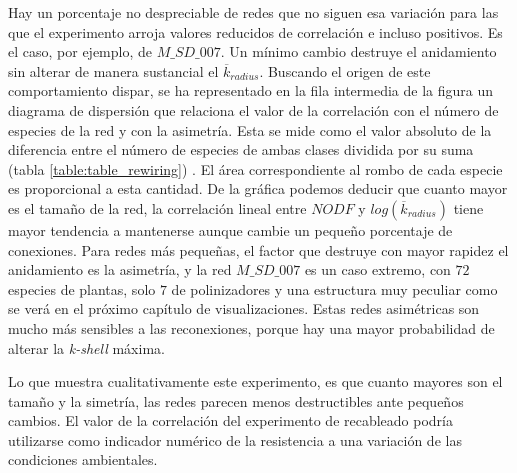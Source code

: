 Hay un porcentaje no despreciable de redes que no siguen esa variación para las que el experimento arroja valores reducidos de correlación e incluso positivos. Es el caso, por ejemplo, de $M\_SD\_007$. Un mínimo cambio destruye el anidamiento sin alterar de manera sustancial el $\overline {k}_{radius}$. Buscando el origen de este comportamiento dispar, se ha representado en la fila intermedia de la figura un diagrama de dispersión que relaciona el valor de la correlación con el número de especies de la red y con la asimetría. Esta se mide como el valor absoluto de la diferencia entre el número de especies de ambas clases dividida por su suma (tabla \ref{table:table_rewiring}) . El área correspondiente al rombo de cada especie es proporcional a esta cantidad. De la gráfica podemos deducir que cuanto mayor es el tamaño de la red, la correlación lineal entre $NODF$ y $log(\overline {k}_{radius})$ tiene mayor tendencia a mantenerse aunque cambie un pequeño porcentaje de conexiones. Para redes más pequeñas, el factor que destruye con mayor rapidez el anidamiento es la asimetría, y la red $M\_SD\_007$ es un caso extremo, con $72$ especies de plantas, solo $7$ de polinizadores y una estructura muy peculiar como se verá en el próximo capítulo de visualizaciones. Estas redes asimétricas son mucho más sensibles a las reconexiones, porque hay una mayor probabilidad de alterar la \textit{k-shell} máxima.

Lo que muestra cualitativamente este experimento, es que cuanto  mayores son el tamaño y la simetría, las redes parecen menos destructibles ante pequeños cambios. El valor de la correlación del experimento de recableado podría utilizarse como indicador numérico de la resistencia a una variación de las condiciones ambientales.

